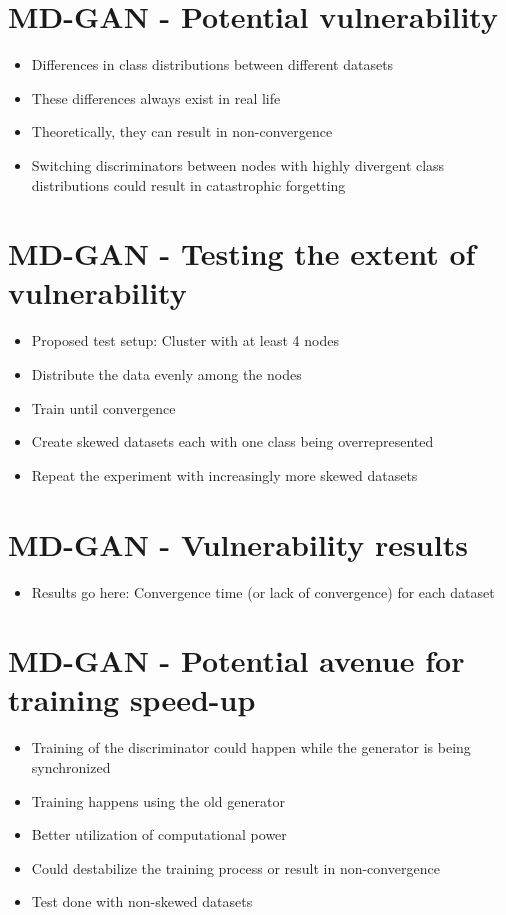 \documentclass[11pt]{article}       %
\newenvironment{slide}[1]        {\section{#1} \begin{itemize}}%
                                 {\end{itemize}}
\begin{document}
\begin{slide}{MD-GAN - Potential vulnerability}
\item Differences in class distributions between different datasets
\item These differences always exist in real life
\item Theoretically, they can result in non-convergence
\item Switching discriminators between nodes with highly divergent class distributions could result in catastrophic forgetting
\end{slide}

\begin{slide}{MD-GAN - Testing the extent of vulnerability}
\item Proposed test setup: Cluster with at least 4 nodes
\item Distribute the data evenly among the nodes
\item Train until convergence
\item Create skewed datasets each with one class being overrepresented
\item Repeat the experiment with increasingly more skewed datasets
\end{slide}

\begin{slide}{MD-GAN - Vulnerability results}
\item Results go here: Convergence time (or lack of convergence) for each dataset
\end{slide}

\begin{slide}{MD-GAN - Potential avenue for training speed-up}
\item Training of the discriminator could happen while the generator is being synchronized
\item Training happens using the old generator
\item Better utilization of computational power
\item Could destabilize the training process or result in non-convergence
\item Test done with non-skewed datasets
\end{slide}
\end{document}
